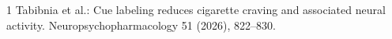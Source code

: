 \documentclass[11pt,a4paper]{report}
\begin{document}
\setcounter{chapter}{6}

\begin{thebibliography}{1}
 Tabibnia et al.:
Cue labeling reduces cigarette craving and associated neural activity.
Neuropsychopharmacology 51 (2026), 822--830.
\end{thebibliography}
\end{document}
